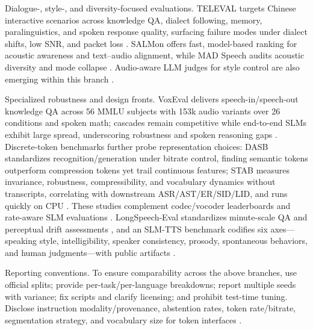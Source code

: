 \documentclass{article}
\begin{document}
Dialogue-, style-, and diversity-focused evaluations. TELEVAL targets Chinese interactive scenarios across knowledge QA, dialect following, memory, paralinguistics, and spoken response quality, surfacing failure modes under dialect shifts, low SNR, and packet loss \cite{li2025televaldynamicbenchmarkdesignedspokenlan}. SALMon offers fast, model-based ranking for acoustic awareness and text--audio alignment, while MAD Speech audits acoustic diversity and mode collapse \cite{maimon2025salmonsuiteacousticlanguagemodelevaluati,futeral2025madspeechmeasuresacousticdiversity}. Audio-aware LLM judges for style control are also emerging within this branch \cite{chiang2025audioawarelargelanguagemodelsasjudgesspe}.

Specialized robustness and design fronts. VoxEval delivers speech-in/speech-out knowledge QA across 56 MMLU subjects with 153k audio variants over 26 conditions and spoken math; cascades remain competitive while end-to-end SLMs exhibit large spread, underscoring robustness and spoken reasoning gaps \cite{cui2025voxevalbenchmarkingknowledgeunderstandin}. Discrete-token benchmarks further probe representation choices: DASB standardizes recognition/generation under bitrate control, finding semantic tokens outperform compression tokens yet trail continuous features; STAB measures invariance, robustness, compressibility, and vocabulary dynamics without transcripts, correlating with downstream ASR/AST/ER/SID/LID, and runs quickly on CPU \cite{mousavi2024dasbdiscreteaudiospeechbenchmark,vashishth2024stabspeechtokenizerassessmentbenchmark}. These studies complement codec/vocoder leaderboards and rate-aware SLM evaluations \cite{guo2025recentadvancesdiscretespeechtokensreview}. LongSpeech-Eval standardizes minute-scale QA and perceptual drift assessments \cite{park2025longformspeechgenerationspokenlanguagemo}, and an SLM-TTS benchmark codifies six axes---speaking style, intelligibility, speaker consistency, prosody, spontaneous behaviors, and human judgments---with public artifacts \cite{wang2024evaluatingtextspeechsynthesislargediscre}.

Reporting conventions. To ensure comparability across the above branches, use official splits; provide per-task/per-language breakdowns; report multiple seeds with variance; fix scripts and clarify licensing; and prohibit test-time tuning. Disclose instruction modality/provenance, abstention rates, token rate/bitrate, segmentation strategy, and vocabulary size for token interfaces \cite{vashishth2024stabspeechtokenizerassessmentbenchmark,entry2025indicsuperbspeechprocessinguniversalperf,noroozi2024instructiondatagenerationunsupervisedada}.

\end{document}
